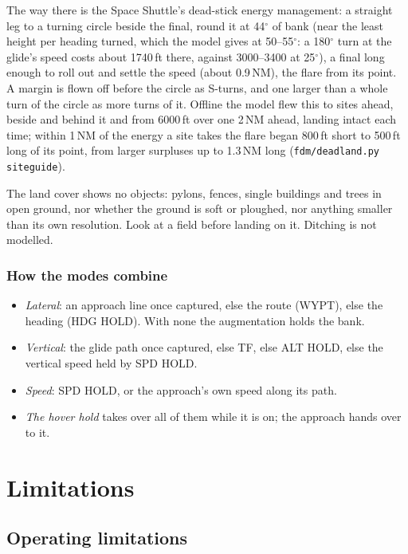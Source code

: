 \documentclass[11pt,a4paper,oneside]{book}
\begin{document}
The way there is the Space Shuttle's dead-stick energy management: a straight leg to a turning circle beside the final,
round it at 44$^\circ$ of bank (near the least height per heading turned, which the model gives at 50--55$^\circ$: a
180$^\circ$ turn at the glide's speed costs about 1740\,ft there, against 3000--3400 at 25$^\circ$), a final long
enough to roll out and settle the speed (about 0.9\,NM), the flare from its point. A margin is flown off before the
circle as S-turns, and one larger than a whole turn of the circle as more turns of it. Offline the model flew this to
sites ahead, beside and behind it and from 6000\,ft over one 2\,NM ahead, landing intact each time; within 1\,NM of
the energy a site takes the flare began 800\,ft short to 500\,ft long of its point, from larger surpluses up to
1.3\,NM long (\texttt{fdm/deadland.py siteguide}).
\begin{caution}
The land cover shows no objects: pylons, fences, single buildings and trees in open ground, nor whether the ground is
soft or ploughed, nor anything smaller than its own resolution. Look at a field before landing on it. Ditching is not
modelled.
\end{caution}

\section{How the modes combine}
\begin{itemize}
\item \emph{Lateral}: an approach line once captured, else the route (WYPT), else the heading (HDG HOLD). With none the
augmentation holds the bank.
\item \emph{Vertical}: the glide path once captured, else TF, else ALT HOLD, else the vertical speed held by SPD HOLD.
\item \emph{Speed}: SPD HOLD, or the approach's own speed along its path.
\item \emph{The hover hold} takes over all of them while it is on; the approach hands over to it.
\end{itemize}

\part{Limitations}
\chapter{Operating limitations}
\end{document}
